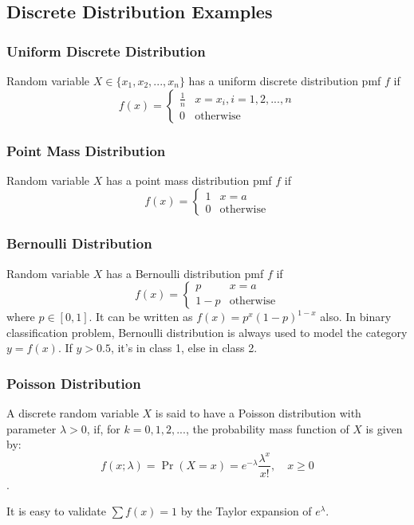 \documentclass[11pt]{article}
\begin{document}
\subsection{Discrete Distribution Examples}
\subsubsection{Uniform Discrete Distribution}
Random variable $X \in \{x_1, x_2, ..., x_n\}$ has a uniform discrete distribution pmf $f$ if 
\[f(x) = \left\{\begin{array}{cc}
\frac{1}{n}  &  x = x_i, i = 1, 2, ..., n \\
0                &  \text{otherwise}
\end{array}
\right.\] 

\subsubsection{Point Mass Distribution}
Random variable $X$ has a point mass distribution pmf $f$ if 
\[f(x) = \left\{\begin{array}{cc}
1 & x= a \\
0 & \text{otherwise}
\end{array}
\right.
\]

\subsubsection{Bernoulli Distribution}
Random variable $X$ has a Bernoulli distribution pmf $f$ if 
\[f(x) = \left\{\begin{array}{cc}
p & x= a \\
1-p & \text{otherwise}
\end{array}
\right.
\]
where $p \in [0,1]$. It can be written as $f(x)=p^x(1-p)^{1-x}$ also. In binary classification problem, Bernoulli distribution is always used to model the category $y = f(x)$. If $y>0.5$, it's in class 1, else in class 2.

\subsubsection{Poisson Distribution}
A discrete random variable $X$ is said to have a Poisson distribution with parameter $\lambda > 0$, 
if, for $k = 0, 1, 2, ...$, the probability mass function of $X$ is given by:
\[f(x; \lambda) = \Pr(X=x)= e^{-\lambda} \frac{\lambda^x }{x!},\quad x\ge 0\].

It is easy to validate $\sum{f(x)}=1$ by the Taylor expansion of $e^\lambda$.
\end{document}
